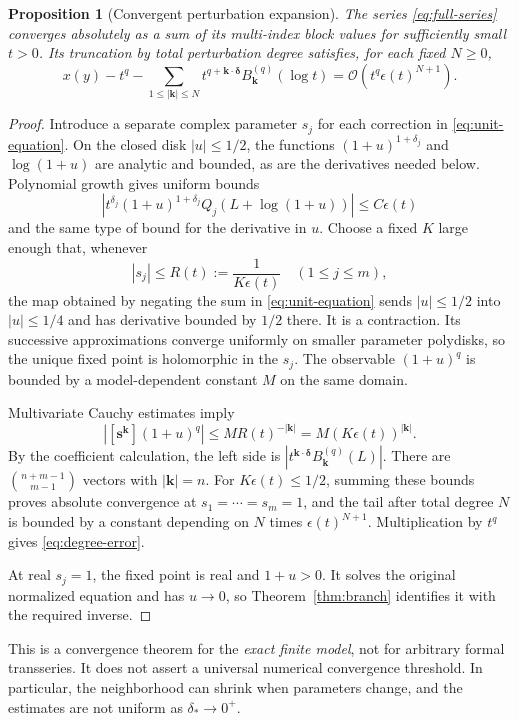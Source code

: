 \documentclass[11pt,a4paper]{article}
\numberwithin{equation}{section}
\newtheorem{proposition}[theorem]{Proposition}
\theoremstyle{definition}
\newcommand{\OO}{\mathcal O}
\newcommand{\kk}{\boldsymbol k}
\newcommand{\deltaa}{\boldsymbol\delta}
\begin{document}
\begin{proposition}[Convergent perturbation expansion]\label{prop:convergence}
The series \eqref{eq:full-series} converges absolutely as a sum of its
multi-index block values for sufficiently small $t>0$. Its truncation
by total perturbation degree satisfies, for each fixed $N\ge0$,
\begin{equation}\label{eq:degree-error}
 x(y)-t^q-\sum_{1\le|\kk|\le N}
 t^{q+\kk\cdot\deltaa}B_{\kk}^{(q)}(\log t)
 =\OO\!\left(t^q\epsilon(t)^{N+1}\right).
\end{equation}
\end{proposition}
\begin{proof}
Introduce a separate complex parameter $s_j$ for each correction in
\eqref{eq:unit-equation}. On the closed disk $|u|\le1/2$, the functions
$(1+u)^{1+\delta_j}$ and $\log(1+u)$ are analytic and bounded, as are
the derivatives needed below. Polynomial growth gives uniform bounds
\[
 \left|t^{\delta_j}(1+u)^{1+\delta_j}
 Q_j(L+\log(1+u))\right|\le C\epsilon(t)
\]
and the same type of bound for the derivative in $u$.
Choose a fixed $K$ large enough that, whenever
\[
 |s_j|\le R(t):=\frac1{K\epsilon(t)}\quad(1\le j\le m),
\]
the map obtained by negating the sum in \eqref{eq:unit-equation}
sends $|u|\le1/2$ into $|u|\le1/4$ and has derivative bounded by
$1/2$ there. It is a contraction. Its successive approximations converge
uniformly on smaller parameter polydisks, so the unique fixed point is
holomorphic in the $s_j$. The observable $(1+u)^q$ is bounded by a
model-dependent constant $M$ on the same domain.

Multivariate Cauchy estimates imply
\[
 \left|[\boldsymbol s^{\kk}](1+u)^q\right|
 \le M R(t)^{-|\kk|}=M(K\epsilon(t))^{|\kk|}.
\]
By the coefficient calculation, the left side is
$|t^{\kk\cdot\deltaa}B_{\kk}^{(q)}(L)|$.
There are $\binom{n+m-1}{m-1}$ vectors with $|\kk|=n$.
For $K\epsilon(t)\le1/2$, summing these bounds proves absolute
convergence at $s_1=\cdots=s_m=1$, and the tail after total degree
$N$ is bounded by a constant depending on $N$ times
$\epsilon(t)^{N+1}$. Multiplication by $t^q$ gives
\eqref{eq:degree-error}.

At real $s_j=1$, the fixed point is real and $1+u>0$. It solves the
original normalized equation and has $u\to0$, so
Theorem~\ref{thm:branch} identifies it with the required inverse.
\end{proof}

This is a convergence theorem for the \emph{exact finite model}, not for
arbitrary formal transseries. It does not assert a universal numerical
convergence threshold. In particular, the neighborhood can shrink when
parameters change, and the estimates are not uniform as
$\delta_*\to0^+$.
\end{document}
